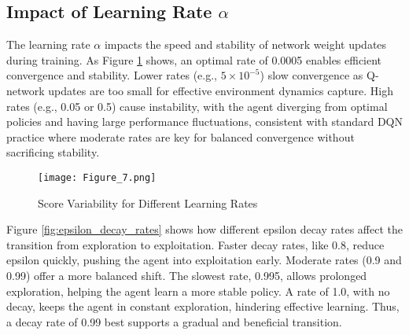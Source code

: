 \documentclass[conference]{IEEEtran}
\begin{document}
\subsection{Impact of Learning Rate $\alpha$}
The learning rate $\alpha$ impacts the speed and stability of network weight updates during training. As Figure \ref{fig:learning_rate_scores} shows, an optimal rate of 0.0005 enables efficient convergence and stability. Lower rates (e.g., $5\times10^{-5}$) slow convergence as Q-network updates are too small for effective environment dynamics capture. High rates (e.g., 0.05 or 0.5) cause instability, with the agent diverging from optimal policies and having large performance fluctuations, consistent with standard DQN practice where moderate rates are key for balanced convergence without sacrificing stability.

\begin{figure}[!ht]
    \centering
    \texttt{[image: Figure\_7.png]}
    \caption{Score Variability for Different Learning Rates}
    \label{fig:learning_rate_scores}
\end{figure}

Figure \ref{fig:epsilon_decay_rates} shows how different epsilon decay rates affect the transition from exploration to exploitation. Faster decay rates, like 0.8, reduce epsilon quickly, pushing the agent into exploitation early. Moderate rates (0.9 and 0.99) offer a more balanced shift. The slowest rate, 0.995, allows prolonged exploration, helping the agent learn a more stable policy. A rate of 1.0, with no decay, keeps the agent in constant exploration, hindering effective learning. Thus, a decay rate of 0.99 best supports a gradual and beneficial transition.
\end{document}
